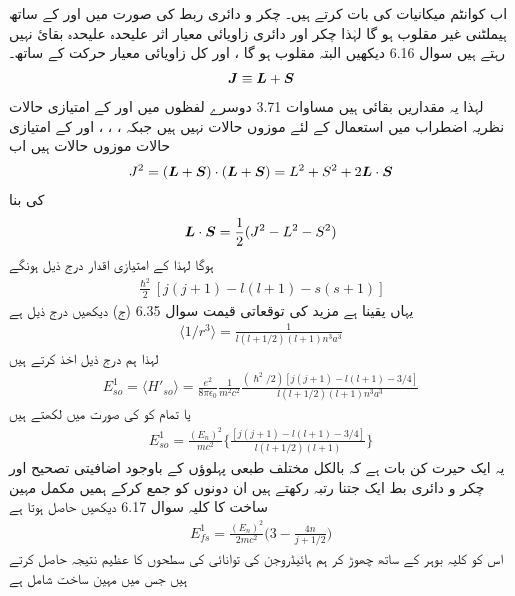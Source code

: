  اب کوانٹم میکانیات کی بات کرتے ہیں۔ چکر و دائری ربط کی صورت میں  اور  کے ساتھ ہیملٹنی غیر مقلوب ہو گا لہٰذا چکر اور دائری زاویائی معیار اثر علیحدہ علیحدہ بقائ نہیں رہتے ہیں سوال 6.16 دیکھیں البتہ  مقلوب ہو گا ،  اور کل زاویائی معیار حرکت کے ساتھ۔
\begin{align}
{\ensuremath{{\boldsymbol{J}}}} \equiv {\ensuremath{{\boldsymbol{L}}}} + {{\boldsymbol{S}}}
\end{align}
لہذا یہ مقداریں بقائی ہیں مساوات 3.71 دوسرے لفظوں میں  اور  کے امتیازی حالات نظریہ اضطراب میں استعمال کے لئے موزوں حالات نہیں ہیں جبکہ ، ، ، اور  کے امتیازی حالات موزوں حالات ہیں اب 
\begin{align*}
J^2 = ({{\boldsymbol{L}}} + {{\boldsymbol{S}}}) \cdot ({{\boldsymbol{L}}} + {{\boldsymbol{S}}}) = L^2 + S^2 + 2 {{\boldsymbol{L}}} \cdot {\ensuremath{{\boldsymbol{S}}}}
\end{align*}
کی بنا 
\begin{align}
{\ensuremath{{\boldsymbol{L}}}} \cdot {\ensuremath{{\boldsymbol{S}}}} = \frac{1}{2} (J^2 - L^2 - S^2)
\end{align}
ہوگا لہذا  کے امتیازی اقدار درج ذیل ہونگے 
\begin{align*}
\frac{\hslash^2}{2} [j (j + 1) - l(l + 1) - s(s + 1)]
\end{align*}
یہاں یقینا  ہے مزید  کی توقعاتی قیمت سوال 6.35 (ج) دیکھیں درج ذیل ہے 
\begin{align}
\langle 1/r^3 \rangle = \frac{1}{l(l + 1/2) (l + 1) n^3 a^3} 
\end{align}
لہذا ہم درج ذیل اخذ کرتے ہیں 
\begin{align*}
E_{so}^1 = \langle H'_{so} \rangle = \frac{e^2}{8 \pi \epsilon_0} \frac{1}{m^2 c^2} \frac{(\hslash^2 /2) [j(j + 1) - l(l + 1) - 3/4]}{l(l + 1/2)(l + 1)n^3 a^3}
\end{align*} 
یا تمام کو  کی صورت میں لکھتے ہیں 
\begin{align}
E^1_{so} = \frac{(E_n)^2}{mc^2} \big \{ \frac{[j(j + 1) - l(l + 1) - 3/4]}{l(l + 1/2)(l + 1)} \big \}
\end{align}
یہ ایک حیرت کن بات ہے کہ بالکل مختلف طبعی پہلوؤں کے باوجود اضافیتی تصحیح اور چکر و دائری بط ایک جتنا رتبہ  رکھتے ہیں ان دونوں کو جمع کرکے ہمیں مکمل مہین ساخت کا کلیہ سوال 6.17 دیکھیں حاصل ہوتا ہے 
\begin{align}
E_{fs}^1 = \frac{(E_n)^2}{2mc^2} \big ( 3 - \frac{4n}{j + 1/2} \big )
\end{align}
اس کو کلیہ بوہر کے ساتھ چھوڑ کر ہم ہائیڈروجن کی توانائی کی سطحوں کا عظیم نتیجہ حاصل کرتے ہیں جس میں مہین ساخت شامل ہے 
